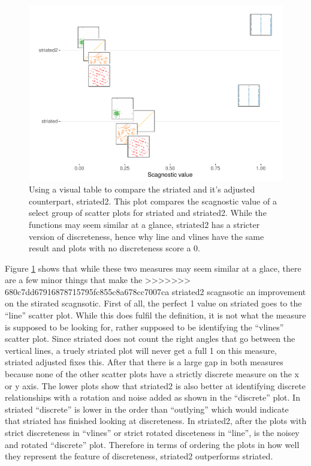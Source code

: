 \begin{Schunk}
\begin{figure}
\includegraphics[width=1\linewidth]{mason-lee-laa-cook_files/figure-latex/striated-vtable-1} \caption[Using a visual table to compare the striated and it's adjusted counterpart, striated2]{Using a visual table to compare the striated and it's adjusted counterpart, striated2. This plot compares the scagnostic value of a select group of scatter plots for striated and striated2. While the functions may seem similar at a glance, striated2 has a stricter version of discreteness, hence why line and vlines have the same result and plots with no discreteness score a 0.}\label{fig:striated-vtable}
\end{figure}
\end{Schunk}

Figure \ref{fig:striated-vtable} shows that while these two measures may
seem similar at a glace, there are a few minor things that make the
>>>>>>> 680c7dd67916878715795fc855c8a678cc7007ca
striated2 scagnsotic an improvement on the stirated scagnsotic. First of
all, the perfect 1 value on striated goes to the ``line'' scatter plot.
While this does fulfil the definition, it is not what the measure is
supposed to be looking for, rather supposed to be identifying the
``vlines'' scatter plot. Since striated does not count the right angles
that go between the vertical lines, a truely striated plot will never
get a full 1 on this measure, striated adjusted fixes this. After that
there is a large gap in both measures because none of the other scatter
plots have a strictly discrete measure on the x or y axis. The lower
plots show that striated2 is also better at identifying discrete
relationships with a rotation and noise added as shown in the
``discrete'' plot. In striated ``discrete'' is lower in the order than
``outlying'' which would indicate that striated has finished looking at
discreteness. In striated2, after the plots with strict discreteness in
``vlines'' or strict rotated disceteness in ``line'', is the noisey and
rotated ``discrete'' plot. Therefore in terms of ordering the plots in
how well they represent the feature of discreteness, striated2
outperforms striated.

